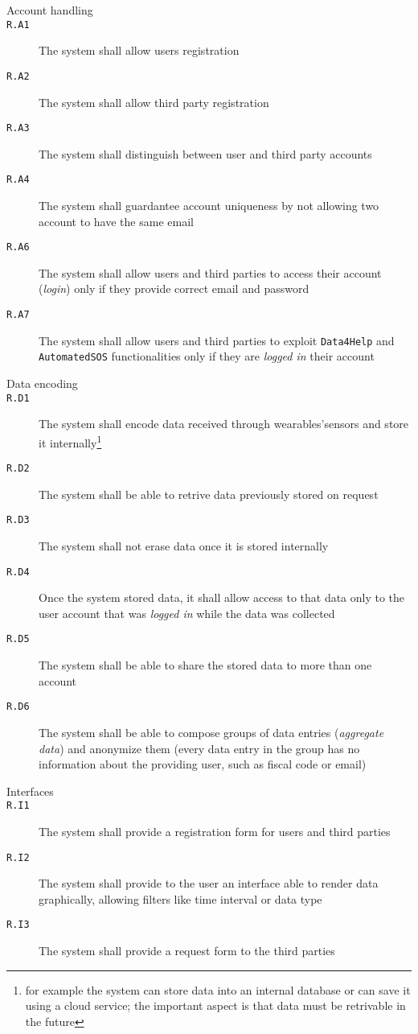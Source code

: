     \begin{description}
      \item[Account handling]
      \item[\texttt{R.A1}] The system shall allow users registration
      \item[\texttt{R.A2}] The system shall allow third party registration
      \item[\texttt{R.A3}] The system shall distinguish between user and third party accounts
      \item[\texttt{R.A4}] The system shall guardantee account uniqueness by not allowing two account to have the same email
      \item[\texttt{R.A6}] The system shall allow users and third parties to access their account (\textit{login}) only if they provide correct email and password
      \item[\texttt{R.A7}] The system shall allow users and third parties to exploit \texttt{Data4Help} and \texttt{AutomatedSOS} functionalities only if they are \textit{logged in} their account

      \item[Data encoding]
      \item[\texttt{R.D1}] The system shall encode data received through wearables'sensors and store it internally\footnote{for example the system can store data into an internal database or can save it using a cloud service; the important aspect is that data must be retrivable in the future}
      \item[\texttt{R.D2}] The system shall be able to retrive data previously stored on request
      \item[\texttt{R.D3}] The system shall not erase data once it is stored internally
      \item[\texttt{R.D4}] Once the system stored data, it shall allow access to that data only to the user account that was \textit{logged in} while the data was collected
      \item[\texttt{R.D5}] The system shall be able to share the stored data to more than one account
      \item[\texttt{R.D6}] The system shall be able to compose groups of data entries (\textit{aggregate data}) and anonymize them (every data entry in the group has no information about the providing user, such as fiscal code or email)

      \item[Interfaces]
      \item[\texttt{R.I1}] The system shall provide a registration form for users and third parties
      \item[\texttt{R.I2}] The system shall provide to the user an interface able to render data graphically, allowing filters like time interval or data type
      \item[\texttt{R.I3}] The system shall provide a request form to the third parties


\end{description}
